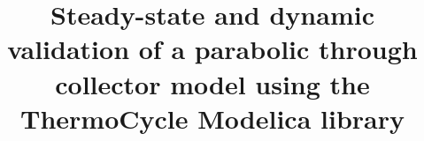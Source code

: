\documentclass[final,3p,times,review]{elsarticle}
\begin{document}
\linenumbers
\modulolinenumbers[1]
\begin{frontmatter}



\title{Steady-state and dynamic validation of a parabolic through collector model using the ThermoCycle Modelica library}



\end{frontmatter}
\end{document}
